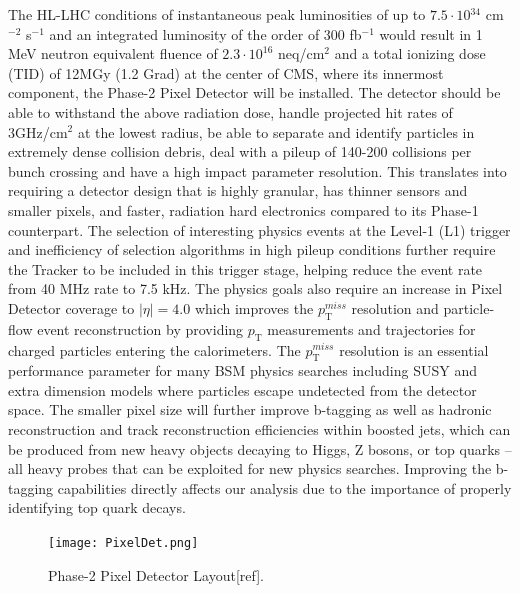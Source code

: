 The HL-LHC conditions of instantaneous peak luminosities of up to $7.5\cdot{10}{^34}$ cm$^{-2}$ s$^{-1}$ and an integrated luminosity of the order of 300 fb$^{-1}$ would result in 1 MeV neutron equivalent fluence of $2.3\cdot{10}^{16}$ neq/cm$^2$ and a total ionizing dose (TID) of 12MGy (1.2 Grad) at the center of CMS, where its innermost component, the Phase-2 Pixel Detector will be installed. The detector should be able to withstand the above radiation dose, handle projected hit rates of 3GHz/cm$^2$ at the lowest radius, be able to separate and identify particles in extremely dense collision debris, deal with a pileup of 140-200 collisions per bunch crossing and have a high impact parameter resolution. This translates into requiring a detector design that is highly granular, has thinner sensors and smaller pixels, and faster, radiation hard electronics compared to its Phase-1 counterpart. The selection of interesting physics events at the Level-1 (L1) trigger and inefficiency of selection algorithms in high pileup conditions further require the Tracker to be included in this trigger stage, helping reduce the event rate from 40 MHz rate to 7.5 kHz. The physics goals also require an increase in Pixel Detector coverage to $|\eta| = 4.0$ which improves the $p_{\text{T}}^{miss}$ resolution and particle-flow event reconstruction by providing $p_\text{T}$ measurements and trajectories for charged particles entering the calorimeters. The $p_{\text{T}}^{miss}$ resolution is an essential performance parameter for many BSM physics searches including SUSY and extra dimension models where particles escape undetected from the detector space. The smaller pixel size will further improve b-tagging as well as hadronic reconstruction and track reconstruction efficiencies within boosted jets, which can be produced from new heavy objects decaying to Higgs, Z bosons, or top quarks -- all heavy probes that can be exploited for new physics searches. Improving the b-tagging capabilities directly affects our analysis due to the importance of properly identifying top quark decays.\\

\begin{figure}[H]
\begin{center}
\texttt{[image: PixelDet.png]} 
\caption{Phase-2 Pixel Detector Layout[ref].}
\label{PixelDet} 
\end{center}
\end{figure}

